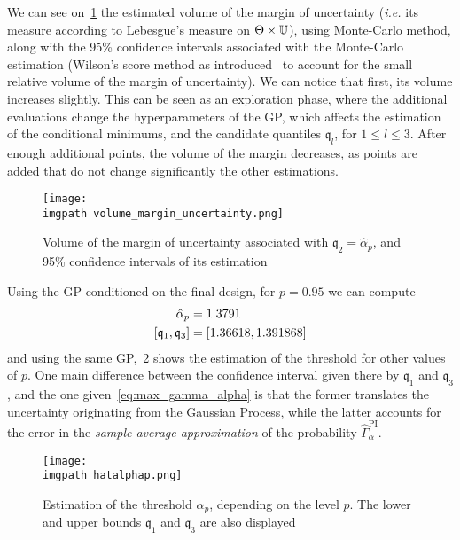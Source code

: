 \documentclass[../../Main_ManuscritThese.tex]{subfiles}
\newcommand\imgpath{/home/victor/acadwriting/Manuscrit/Text/Chapter5/img/}
\begin{document}
We can see on~\cref{fig:vol_Meta} the estimated volume of the margin
of uncertainty (\emph{i.e.} its measure according to Lebesgue's
measure on $\Theta \times \mathbb{U}$), using Monte-Carlo method, along
with the 95\% confidence intervals associated with the Monte-Carlo
estimation (Wilson's score method as
introduced~\cite{wilson_probable_1927} to account for the small
relative volume of the margin of uncertainty).  We can notice that
first, its volume increases slightly. This can be seen as an
exploration phase, where the additional evaluations change the
hyperparameters of the GP, which affects the estimation of the
conditional minimums, and the candidate quantiles $\mathfrak{q}_l$,
for $1\leq l \leq 3$. After enough additional points, the volume of
the margin decreases, as points are added that do not change
significantly the other estimations.

\begin{figure}[ht]
  \centering
  \texttt{[image: \\imgpath volume\_margin\_uncertainty.png]}
  \caption[Volume of the margin of uncertainty associated with
  $\mathfrak{q}_2 = \hat{\alpha}_p$]{\label{fig:vol_Meta} Volume of
    the margin of uncertainty associated with
    $\mathfrak{q}_2 = \hat{\alpha}_p$, and 95\% confidence intervals
    of its estimation}
\end{figure}


Using the GP conditioned on the final design, for $p=0.95$ we can compute
\begin{align}
  \hat{\alpha}_p &= \num{1.3791} \\
  \interval{\mathfrak{q}_1}{\mathfrak{q}_3} &= \interval{1.36618}{1.391868} \nonumber
\end{align}
and using the same GP,~\cref{fig:hat_alpha_p} shows the estimation of
the threshold for other values of $p$.  One main difference between
the confidence interval given there by $\mathfrak{q}_1$ and
$\mathfrak{q}_3$, and the one given~\cref{eq:max_gamma_alpha} is that
the former translates the uncertainty originating from the Gaussian
Process, while the latter accounts for the error in the \emph{sample
  average approximation} of the probability
$\hat{\Gamma}_{\alpha}^{\mathrm{PI}}$.
\begin{figure}[ht]
  \centering
  \texttt{[image: \\imgpath hatalphap.png]}
  \caption[Estimation of the threshold $\alpha_p$, depending on the
  level $p$]{\label{fig:hat_alpha_p} Estimation of the threshold
    $\alpha_p$, depending on the level $p$. The lower and upper bounds
    $\mathfrak{q}_1$ and $\mathfrak{q}_3$ are also displayed}
\end{figure}
\end{document}
